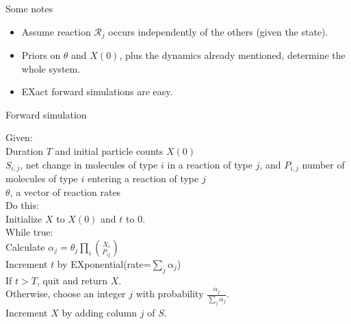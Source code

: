 \documentclass[12pt,a4paper,t,xcolor=dvipsnames,slidestop,compress,mathserif]{beamer}
\begin{document}
\begin{frame}{Some notes}

\begin{itemize}
\item Assume reaction $\mathcal{R}_j$ occurs independently of the others (given the state).\item Priors on $\theta$ and $X(0)$, plus the dynamics already mentioned, determine the whole system.
\item EXact forward simulations are easy.
\end{itemize}
\end{frame}

\begin{frame}{Forward simulation}


\begin{algorithm}[H]
Given:\\
\Indp
Duration $T$ and initial particle counts $X(0)$\\
$S_{i,j}$, net change in molecules of type $i$ in a reaction of type $j$, and $P_{i,j}$ number of molecules of type $i$ entering a reaction of type $j$\\
$\theta$, a vector of reaction rates\\
\Indm
Do this:\\
\Indp
Initialize $X$ to $X(0)$ and $t$ to 0.\\
While true:\\
\Indp
Calculate $\alpha_j = \theta_j\prod_i {X_i\choose P_{ij}}$\\
Increment $t$ by EXponential(rate=$\sum_j \alpha_j$) \\
If $t > T$, quit and return $X$.\\
Otherwise, choose an integer $j$ with probability $\frac{\alpha_j}{\sum_j \alpha_j}$.\\
Increment $X$ by adding column $j$ of $S$.\\
\end{algorithm}


\end{frame}

\end{document}
